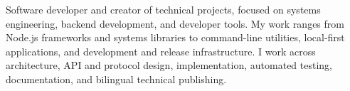 Software developer and creator of technical projects, focused on systems engineering, backend development, and developer tools. My work ranges from Node.js frameworks and systems libraries to command-line utilities, local-first applications, and development and release infrastructure. I work across architecture, API and protocol design, implementation, automated testing, documentation, and bilingual technical publishing.
